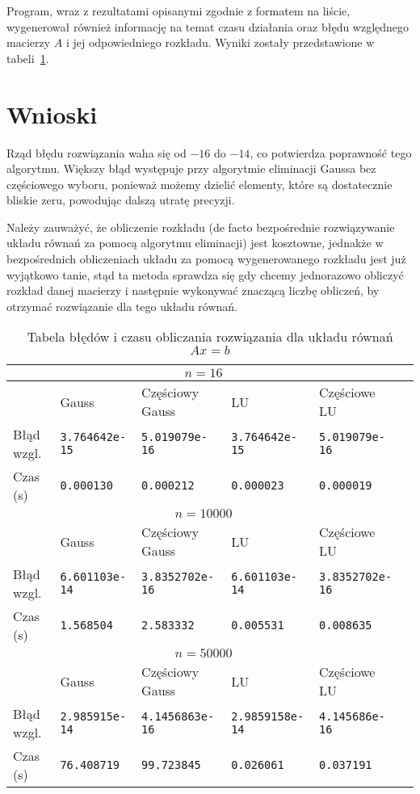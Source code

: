 \documentclass[../main.tex]{subfiles}
\begin{document}
  Program, wraz z rezultatami opisanymi zgodnie z formatem na liście, wygenerował
  również informację na temat czasu działania oraz błędu względnego macierzy
  \( A \) i jej odpowiedniego rozkładu. Wyniki zostały przedstawione w tabeli~\ref{tab:results}.

  \section{Wnioski}

  Rząd błędu rozwiązania waha się od \( -16 \) do \( -14 \), co potwierdza poprawność tego
  algorytmu. Większy błąd występuje przy algorytmie eliminacji Gaussa bez częściowego wyboru,
  ponieważ możemy dzielić elementy, które są dostatecznie bliskie zeru, powodując dalszą
  utratę precyzji.

  Należy zauważyć, że obliczenie rozkładu (de facto bezpośrednie rozwiązywanie układu równań
  za pomocą algorytmu eliminacji) jest kosztowne, jednakże w bezpośrednich obliczeniach
  układu za pomocą wygenerowanego rozkładu jest już wyjątkowo tanie, stąd ta metoda sprawdza się
  gdy chcemy jednorazowo obliczyć rozkład danej macierzy i następnie wykonywać znaczącą liczbę
  obliczeń, by otrzymać rozwiązanie dla tego układu równań. 

  \begin{table}
    \label{tab:results}
    \centering
    \begin{tabular}{|l|l|l|l|l|l|}
      \hline 
      \multicolumn{5}{|c|}{$n = 16$} \\\hline 
      & Gauss & Częściowy Gauss & LU & Częściowe LU \\ \hline
      Błąd wzgl. & \texttt{3.764642e-15} & \texttt{5.019079e-16} &
      \texttt{3.764642e-15} &
      \texttt{5.019079e-16} \\ \hline
      Czas (s) & \texttt{0.000130} & \texttt{0.000212} & \texttt{0.000023} & \texttt{0.000019} \\ \hline
      \multicolumn{5}{|c|}{$n = 10000$} \\\hline 
      & Gauss & Częściowy Gauss & LU & Częściowe LU \\ \hline
      Błąd wzgl. & \texttt{6.601103e-14} & \texttt{3.8352702e-16} &
      \texttt{6.601103e-14} &
      \texttt{3.8352702e-16} \\ \hline
      Czas (s) & \texttt{1.568504} & \texttt{2.583332} & \texttt{0.005531} & \texttt{0.008635} \\ \hline
      \multicolumn{5}{|c|}{$n = 50000$} \\\hline 
      & Gauss & Częściowy Gauss & LU & Częściowe LU \\ \hline
      Błąd wzgl. & \texttt{2.985915e-14} & \texttt{4.1456863e-16} &
      \texttt{2.9859158e-14} &
      \texttt{4.145686e-16} \\ \hline
      Czas (s) & \texttt{76.408719} & \texttt{99.723845} & \texttt{0.026061} & \texttt{0.037191} \\ \hline
    \end{tabular}
    \caption{Tabela błędów i czasu obliczania rozwiązania dla układu równań \( Ax = b \)}
  \end{table}
\end{document}
